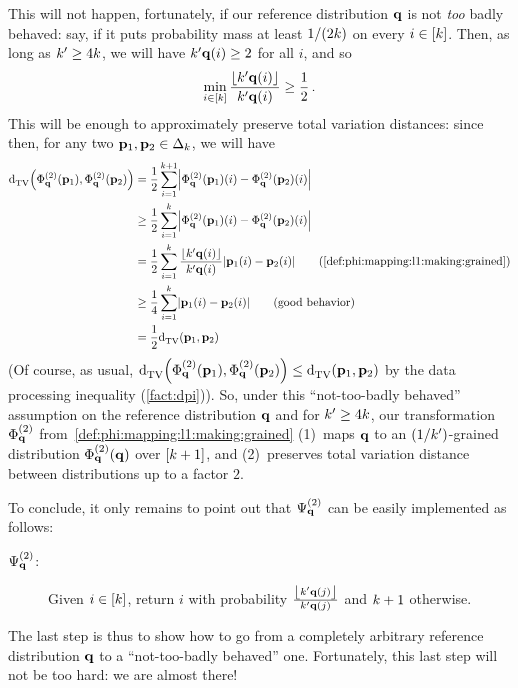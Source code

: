 This will not happen, fortunately, if our reference distribution $\mathbf{q}$ is not \emph{too} badly behaved: say, if it puts probability mass at least $1/(2k)$ on every $i\in[k]$. Then, as long as $k'\geq 4k$, we will have $k'\mathbf{q}(i)\geq 2$ for all $i$, and so
\[
	\min_{i\in[\ab]}\frac{\flr{\ab'\q(i)}}{\ab'\q(i)} \geq\frac{1}{2}\,.
\]
This will be enough to approximately preserve total variation distances: since then, for any two $\mathbf{p}_1,\mathbf{p}_2\in\Delta_{k}$, we will have
\begin{align}
	\totalvardist{\Phi^{(2)}_\q(\p_1)}{\Phi^{(2)}_\q(\p_2)}
	&= \frac{1}{2}\sum_{i=1}^{\ab+1} \abs{\Phi^{(2)}_\q(\p_1)(i)-\Phi^{(2)}_\q(\p_2)(i)} \notag\\
	&\geq \frac{1}{2}\sum_{i=1}^{\ab} \abs{\Phi^{(2)}_\q(\p_1)(i)-\Phi^{(2)}_\q(\p_2)(i)} \notag\\
	&= \frac{1}{2}\sum_{i=1}^{\ab} \frac{\flr{\ab'\q(i)}}{\ab'\q(i)}\abs{\p_1(i)-\p_2(i)} \tag{\cref{def:phi:mapping:l1:making:grained}}\\
	&\geq \frac{1}{4}\sum_{i=1}^{\ab}\abs{\p_1(i)-\p_2(i)} \tag{good behavior}\\
	&= \frac{1}{2}\totalvardist{\p_1}{\p_2}	\label{eq:phi:mapping:l1:making:grained:distances}
\end{align}
(Of course, as usual, $\totalvardist{\Phi^{(2)}_\q(\p_1)}{\Phi^{(2)}_\q(\p_2)}\leq \totalvardist{\p_1}{\p_2}$ by the data processing inequality (\cref{fact:dpi})). So, under this ``not-too-badly behaved'' assumption on the reference distribution $\mathbf{q}$ and for $k' \geq 4k$, our transformation $\Phi^{(2)}_{\mathbf{q}}$ from~\cref{def:phi:mapping:l1:making:grained} (1)~maps $\mathbf{q}$ to an $(1/k')$-grained distribution $\Phi^{(2)}_{\mathbf{q}}(\mathbf{q})$ over $[k+1]$, and (2)~preserves total variation distance between distributions up to a factor $2$.

To conclude, it only remains to point out that $\Psi^{(2)}_{\mathbf{q}}$ can be easily implemented as follows:
\begin{description}
	\item[$\Psi^{(2)}_{\mathbf{q}}$:] Given $i \in [k]$, return $i$ with probability $\frac{\flr{\ab'\q(j)}}{\ab'\q(j)}$ and $k+1$ otherwise.
\end{description}
The last step is thus to show how to go from a completely arbitrary reference distribution $\mathbf{q}$ to a ``not-too-badly behaved'' one. Fortunately, this last step will not be too hard: we are almost there!


